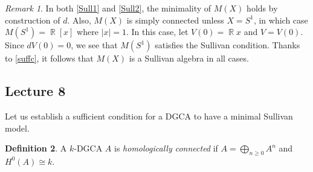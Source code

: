 \documentclass[10pt,letterpaper,cm]{nupset}
\theoremstyle{definition}
\newtheorem{defn}{Definition}[subsection]
\theoremstyle{theorem}
\theoremstyle{remark}
\newtheorem{remark}[defn]{Remark}
\DeclareMathOperator{\R}{\mathbb{R}}
\newcommand{\1}{\mathbb{1}}
\newcommand{\0}{\vec 0}
\begin{document}
\begin{remark}
In both \cref{Sull1} and \cref{Sull2}, the minimality of $M(X)$ holds by construction of $d$. Also, $M(X)$ is simply connected unless $X = S^1$, in which case $M(S^1) = \R\left[x\right]$ where $\left\lvert{x}\right\rvert =1$. In this case, let $V(0) = \R{x}$ and $V = V(0)$. Since $d{V(0)} =0$, we see that $M(S^1)$ satisfies the Sullivan condition. Thanks to \cref{suffc}, it follows that $M(X)$ is a Sullivan algebra in all cases.
\end{remark}


\subsection{Lecture 8}

Let us establish a sufficient condition for a DGCA to have a minimal Sullivan model.

\begin{defn}
A $k$-DGCA $A$ is \textit{homologically connected} if $A = \bigoplus_{n \geq 0}A^n$ and $H^0(A) \cong k$. 
\end{defn}
\end{document}
